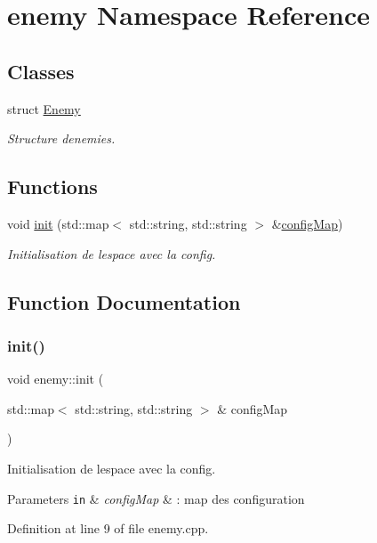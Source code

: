 \hypertarget{namespaceenemy}{}\section{enemy Namespace Reference}
\label{namespaceenemy}
\subsection*{Classes}
\begin{DoxyCompactItemize}
\item 
struct \hyperlink{structenemy_1_1_enemy}{Enemy}
\begin{DoxyCompactList}\small\item\em Structure d\textquotesingle{}enemies. \end{DoxyCompactList}\end{DoxyCompactItemize}
\subsection*{Functions}
\begin{DoxyCompactItemize}
\item 
void \hyperlink{namespaceenemy_ac229022d366657680b3b269ca9674734}{init} (std\+::map$<$ std\+::string, std\+::string $>$ \&\hyperlink{main_8cpp_ada2160bcc2082e595d02f0eb5a318dd5}{config\+Map})
\begin{DoxyCompactList}\small\item\em Initialisation de l\textquotesingle{}espace avec la config. \end{DoxyCompactList}\end{DoxyCompactItemize}


\subsection{Function Documentation}
\mbox{\label{namespaceenemy_ac229022d366657680b3b269ca9674734}} 
\subsubsection{\texorpdfstring{init()}{init()}}
{\footnotesize\ttfamily void enemy\+::init (\begin{DoxyParamCaption}\item[{std\+::map$<$ std\+::string, std\+::string $>$ \&}]{config\+Map }\end{DoxyParamCaption})}



Initialisation de l\textquotesingle{}espace avec la config. 


\begin{DoxyParams}[1]{Parameters}
\mbox{\tt in}  & {\em config\+Map} & \+: map des configuration \\
\hline
\end{DoxyParams}


Definition at line 9 of file enemy.\+cpp.

